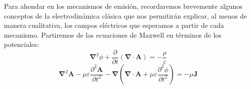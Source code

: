 \documentclass[12 pt, a4paper]{article} %
\numberwithin{equation}{section}
\numberwithin{figure}{section}
\numberwithin{table}{section}
\newcommand{\vect}[1]{\boldsymbol{\mathbf{#1}}}
\begin{document}
Para ahondar en los mecanismos de emisión, recordaremos brevemente algunos conceptos de la electrodinámica clásica que nos permitirán explicar, al menos de manera cualitativa, los campos eléctricos que esperamos a partir de cada mecanismo. Partiremos de las ecuaciones de Maxwell en términos de los potenciales:
	\begin{equation}
	\vect{\nabla}^2\phi+\frac{\partial}{\partial t}\left(\vect{\nabla}\cdot\vect{A}\right)=-\frac{\rho}{\varepsilon}\label{ec31}
	\end{equation}
	\begin{equation}
	\vect{\nabla}^2\vect{A}-\mu\varepsilon\frac{\partial^2\vect{A}}{\partial t^2}-\vect{\nabla}\left(\vect{\nabla}\cdot\vect{A}+\mu\varepsilon\frac{\partial^2\phi}{\partial t^2}\right)=-\mu\vect{J}\label{ec32}
	\end{equation}
\end{document}
